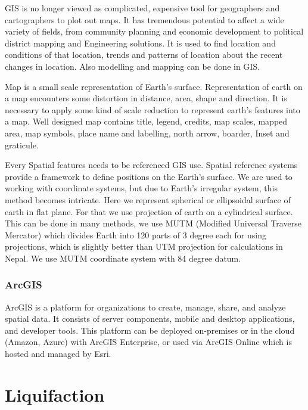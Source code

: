 GIS is no longer viewed as complicated, expensive tool for geographers and cartographers to plot out maps. It has tremendous potential to affect a wide variety of fields, from community planning and economic development to political district mapping and Engineering solutions. It is used to find location and conditions of that location, trends and patterns of location about the recent changes in location. Also modelling and mapping can be done in GIS.

Map is a small scale representation of Earth’s surface. Representation of earth on a map encounters some distortion in distance, area, shape and direction. It is necessary to apply some kind of scale reduction to represent earth’s features into a map. Well designed map contains title, legend, credits, map scales, mapped area, map symbols, place name and labelling, north arrow, boarder, Inset and graticule.

Every Spatial features needs to be referenced GIS use. Spatial reference systems provide a framework to define positions on the Earth’s surface. We are used to working with coordinate systems, but due to Earth’s irregular system, this method becomes intricate. Here we represent spherical or ellipsoidal surface of earth in flat plane. For that we use projection of earth on a cylindrical surface. This can be done in many methods, we use MUTM (Modified Universal Traverse Mercator) which divides Earth into 120 parts of 3 degree each for using projections, which is slightly better than UTM projection for calculations in Nepal. We use MUTM coordinate system with 84 degree datum.

\subsubsection{ArcGIS}
ArcGIS is a platform for organizations to create, manage, share, and analyze spatial data. It consists of server components, mobile and desktop applications, and developer tools. This platform can be deployed on-premises or in the cloud (Amazon, Azure) with ArcGIS Enterprise, or used via ArcGIS Online which is hosted and managed by Esri.\cite{noauthor_arcgiscom_nodate}
\section{Liquifaction}
